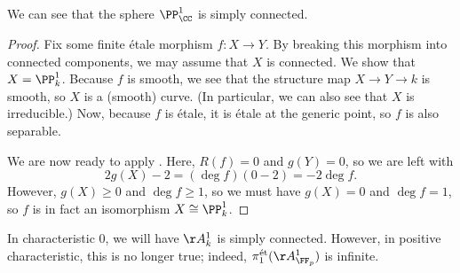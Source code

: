 \documentclass[../notes.tex]{subfiles}
\begin{document}
\begin{example}
	We can see that the sphere $\PP^1_\CC$ is simply connected.
\end{example}
\begin{proof}
	Fix some finite \'etale morphism $f\colon X\to Y$. By breaking this morphism into connected components, we may assume that $X$ is connected. We show that $X=\PP^1_k$. Because $f$ is smooth, we see that the structure map $X\to Y\to k$ is smooth, so $X$ is a (smooth) curve. (In particular, we can also see that $X$ is irreducible.) Now, because $f$ is \'etale, it is \'etale at the generic point, so $f$ is also separable.

	We are now ready to apply . Here, $R(f)=0$ and $g(Y)=0$, so we are left with
	\[2g(X)-2=(\deg f)(0-2)=-2\deg f.\]
	However, $g(X)\ge0$ and $\deg f\ge1$, so we must have $g(X)=0$ and $\deg f=1$, so $f$ is in fact an isomorphism $X\cong\PP^1_k$.
\end{proof}
\begin{remark}
	In characteristic $0$, we will have $\AA^1_k$ is simply connected. However, in positive characteristic, this is no longer true; indeed, $\pi_1^{\text{\'et}}(\AA^1_{\FF_p})$ is infinite.
\end{remark}
\end{document}
